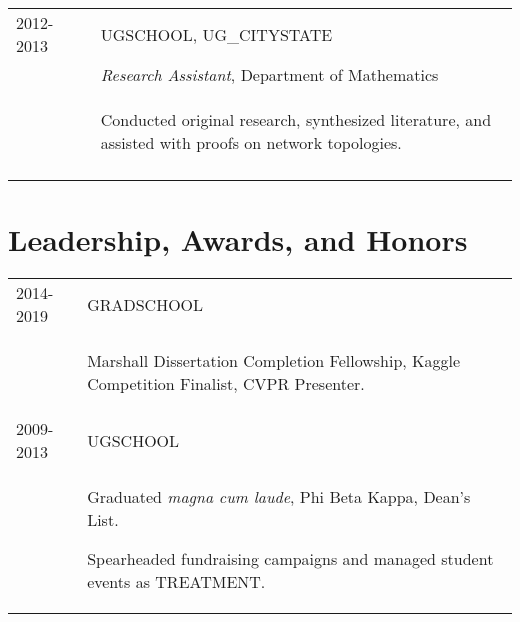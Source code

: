\documentclass[a4paper,10pt]{article}
\begin{document}
\begin{supertabular}{l p{0.55cm} p{13.9cm}}
	\textsc{2012-2013}		&& \textsc{UGSCHOOL}, UG_CITYSTATE \\
	\textsc{}							&& \small	\emph{Research Assistant}, Department of Mathematics \\
												&& \begin{enumerate*}[label =$\diamond$, itemjoin={\newline}]
														\item \footnotesize Conducted original research, synthesized literature, and assisted with proofs on network topologies.
														\end{enumerate*} \\
	 \\


\end{supertabular}





\section{Leadership, Awards, and Honors}
\begin{supertabular}{p{3.4cm} p{13.9cm}}

	\textsc{2014-2019} 				& \textsc{GRADSCHOOL} \\
														& \begin{enumerate*}[label =$\diamond$, itemjoin={\newline}]
																\item \footnotesize Marshall Dissertation Completion Fellowship, Kaggle Competition Finalist, CVPR Presenter.
																\end{enumerate*} \vspace{2mm} \\

	\textsc{2009-2013} 				& \textsc{UGSCHOOL} \\
														& \begin{enumerate*}[label =$\diamond$, itemjoin={\newline}]
																\item \footnotesize  Graduated \emph{magna cum laude}, Phi Beta Kappa, Dean's List.
																\item \footnotesize  Spearheaded fundraising campaigns and managed student events as TREATMENT.
																\end{enumerate*} \vspace{2mm} \\



\end{supertabular}
\end{document}

